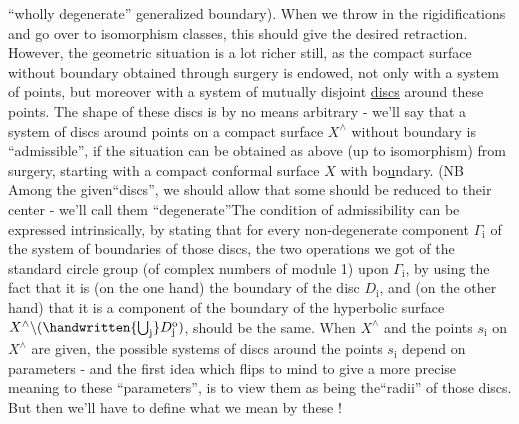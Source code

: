 

``wholly degenerate'' generalized boundary). When we throw in the rigidifications and go over to isomorphism classes, this should give the desired retraction. However, the geometric situation is a lot richer still, as the compact surface without boundary obtained through surgery is endowed, not only with a system of \handwritten{$\nu$} points, but moreover with a system of mutually disjoint \uline{discs} around these points. The shape of these discs is by no means arbitrary - we'll say that a system of discs around \handwritten{$\nu$} points on a compact  surface $X^{\wedge}$ without boundary is ``admissible'', if the situation can be obtained as above (up to isomorphism) from surgery, starting with a compact conformal surface $X$ with bo\uline{u}ndary. (NB Among the given``discs'', we should allow that some should be reduced to their center - we'll call them ``degenerate''\handwritten{)}The condition of admissibility can be expressed intrinsically, by stating that  for every non-degenerate component $\Gamma_{\mathrm i}$ of the system of boundaries of those discs, the two operations we got of the standard circle group (of complex numbers of module 1) upon $\Gamma_{\mathrm i}$, by using the fact that it is (on the one hand) the boundary of the disc $D_{\mathrm i}$, and (on the other hand) that it is a component of the boundary of the hyperbolic surface $X^\wedge\backslash(\handwritten{\bigcup_{\mathrm j}}D^{\mathrm o}_{\mathrm j})$, should be the same. \margin{\handwritten{!}} When $X^\wedge$ and the points $s_{\mathrm i}$ on $X^\wedge$ are given, the possible  systems of discs around the points $s_{\mathrm i}$ depend on \handwritten{$\nu$} parameters - and the first idea which flips to mind to give a more precise meaning to these ``parameters'', is to view them as being the``radii'' of those discs. But then we'll have to define what we mean by these !

